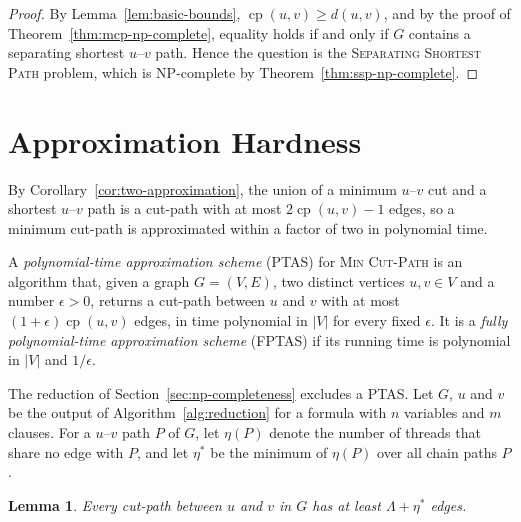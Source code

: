\documentclass[a4paper,fleqn]{cas-sc}
\numberwithin{equation}{section}
\theoremstyle{definition}
\theoremstyle{plain}
\newtheorem{lemma}[definition]{Lemma}
\theoremstyle{remark}
\newcommand{\cp}{\operatorname{cp}}                  %
\newcommand{\MinCutPath}{\textsc{Min Cut-Path}}
\newcommand{\SSP}{\textsc{Separating Shortest Path}}
\begin{document}
\begin{proof}
By Lemma~\ref{lem:basic-bounds}, $\cp(u, v) \geq d(u, v)$, and by the proof of Theorem~\ref{thm:mcp-np-complete}, equality holds if and only if $G$ contains a separating shortest $u$--$v$ path.
Hence the question is the \SSP{} problem, which is NP-complete by Theorem~\ref{thm:ssp-np-complete}.
\end{proof}

\section{Approximation Hardness}
\label{sec:approximation}

By Corollary~\ref{cor:two-approximation}, the union of a minimum $u$--$v$ cut and a shortest $u$--$v$ path is a cut-path with at most $2\cp(u,v) - 1$ edges, so a minimum cut-path is approximated within a factor of two in polynomial time.

A \emph{polynomial-time approximation scheme} (PTAS) for \MinCutPath{} is an algorithm that, given a graph $G = (V, E)$, two distinct vertices $u, v \in V$ and a number $\epsilon > 0$, returns a cut-path between $u$ and $v$ with at most $(1+\epsilon)\cp(u,v)$ edges, in time polynomial in $|V|$ for every fixed $\epsilon$.
It is a \emph{fully polynomial-time approximation scheme} (FPTAS) if its running time is polynomial in $|V|$ and $1/\epsilon$.

The reduction of Section~\ref{sec:np-completeness} excludes a PTAS.
Let $G$, $u$ and $v$ be the output of Algorithm~\ref{alg:reduction} for a formula with $n$ variables and $m$ clauses.
For a $u$--$v$ path $P$ of $G$, let $\eta(P)$ denote the number of threads that share no edge with $P$, and let $\eta^{*}$ be the minimum of $\eta(P)$ over all chain paths $P$.

\begin{lemma}
\label{lem:missed-threads}
Every cut-path between $u$ and $v$ in $G$ has at least $\Lambda + \eta^{*}$ edges.
\end{lemma}
\end{document}
